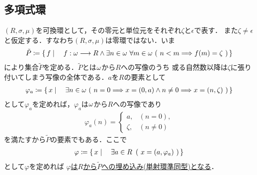 \subsection{多項式環}
	$(R,\sigma,\mu)$を可換環として，その零元と単位元をそれぞれ$\zeta$と$\epsilon$で表す．
	また$\zeta \neq \epsilon$と仮定する．すなわち$(R,\sigma,\mu)$は零環ではない．いま
	\begin{align}
		\tilde{P} \coloneqq \left\{\, f \mid \quad f:{\bf \omega} \longrightarrow R \wedge 
		\exists n \in {\bf \omega}\ \forall m \in {\bf \omega}\ (\ n < m \Longrightarrow f(m) = \zeta\ )\, \right\}
	\end{align}
	により集合$\tilde{P}$を定める．$\tilde{P}$とは${\bf \omega}$から$R$への写像のうち
	或る自然数以降は$\zeta$に張り付いてしまう写像の全体である．$a$を$R$の要素として
	\begin{align}
		\varphi_a \coloneqq \left\{\, x \mid \quad \exists n \in {\bf \omega}\ (\ n = 0 \Longrightarrow x = (0,a)
		\wedge n \neq 0 \Longrightarrow x = (n,\zeta)\ )\, \right\}
	\end{align}
	として$\varphi_a$を定めれば，$\varphi_a$は${\bf \omega}$から$R$への写像であり
	\begin{align}
		\varphi_a(n) = 
		\begin{cases}
			a, & (n=0), \\
			\zeta, & (n \neq 0)
		\end{cases}
	\end{align}
	を満たすから$\tilde{P}$の要素でもある．ここで
	\begin{align}
		\varphi \coloneqq \Set{x}{\exists a \in R\ \left(\ x=(a,\varphi_a)\ \right)}
	\end{align}
	として$\varphi$を定めれば
	\underline{$\varphi$は$R$から$\tilde{P}$への埋め込み(単射環準同型)となる}．
	
	\begin{prf}
	\end{prf}
	
